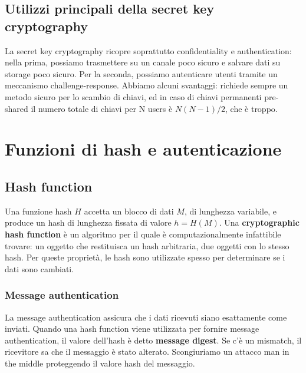 \documentclass[11pt]{article}
\begin{document}
\subsection{Utilizzi principali della secret key cryptography}
La secret key cryptography ricopre soprattutto confidentiality e authentication: nella prima, possiamo trasmettere su un canale poco sicuro e salvare dati su storage poco sicuro. Per la seconda, possiamo autenticare utenti tramite un meccanismo challenge-response.
Abbiamo alcuni svantaggi: richiede sempre un metodo sicuro per lo scambio di chiavi, ed in caso di chiavi permanenti pre-shared il numero totale di chiavi per N users è $N(N-1)/2$, che è troppo.

\section{Funzioni di hash e autenticazione}
\subsection{Hash function}
Una funzione hash $H$ accetta un blocco di dati $M$, di lunghezza variabile, e produce un hash di lunghezza fissata di valore $h=H(M)$. Una \textbf{cryptographic hash function} è un algoritmo per il quale è computazionalmente infattibile trovare: un oggetto che restituisca un hash arbitraria, due oggetti con lo stesso hash. Per queste proprietà, le hash sono utilizzate spesso per determinare se i dati sono cambiati. 
\subsubsection{Message authentication}
La message authentication assicura che i dati ricevuti siano esattamente come inviati. Quando una hash function viene utilizzata per fornire message authentication, il valore dell'hash è detto \textbf{message digest}. Se c'è un mismatch, il ricevitore sa che il messaggio è stato alterato. 
Scongiuriamo un attacco man in the middle proteggendo il valore hash del messaggio.
\end{document}
